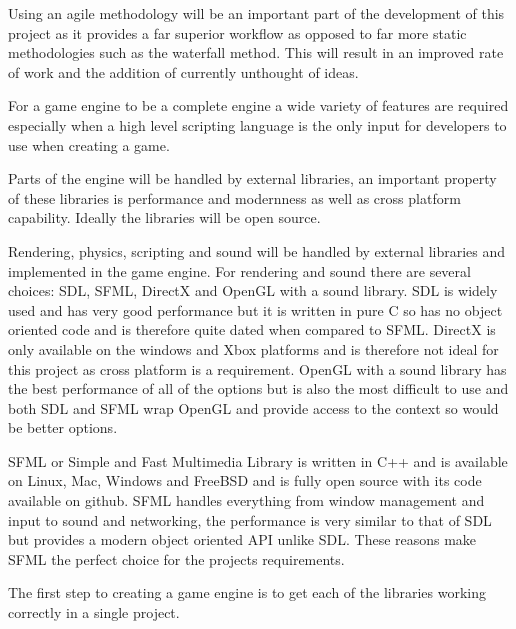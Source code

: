\documentclass[11pt,a4paper,titlepage]{article}
\begin{document}

	Using an agile methodology will be an important part of the development of this project as it provides a far superior workflow as opposed to far more static methodologies such as the waterfall method. This will result in an improved rate of work and the addition of currently unthought of ideas.


	For a game engine to be a complete engine a wide variety of features are required especially when a high level scripting language is the only input for developers to use when creating a game.


	Parts of the engine will be handled by external libraries, an important property of these libraries is performance and modernness as well as cross platform capability. Ideally the libraries will be open source.

	Rendering, physics, scripting and sound will be handled by external libraries and implemented in the game engine. For rendering and sound there are several choices: SDL, SFML, DirectX and OpenGL with a sound library. SDL is widely used and has very good performance but it is written in pure C so has no object oriented code and is therefore quite dated when compared to SFML. DirectX is only available on the windows and Xbox platforms and is therefore not ideal for this project as cross platform is a requirement. OpenGL with a sound library has the best performance of all of the options but is also the most difficult to use and both SDL and SFML wrap OpenGL and provide access to the context so would be better options.

	SFML or Simple and Fast Multimedia Library is written in C++ and is available on Linux, Mac, Windows and FreeBSD and is fully open source with its code available on github. SFML handles everything from window management and input to sound and networking, the performance is very similar to that of SDL but provides a modern object oriented API unlike SDL. These reasons make SFML the perfect choice for the projects requirements.


	The first step to creating a game engine is to get each of the libraries working correctly in a single project.
\end{document}
